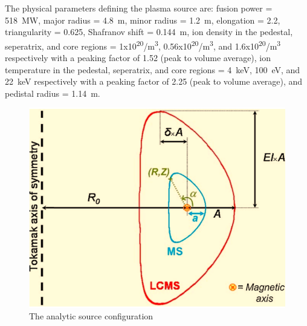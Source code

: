 \documentclass[12pt, letterpaper]{elsarticle}
\begin{document}
The physical parameters defining the plasma source \cite{ref_11} are: fusion power = \SI{518}{MW}, major radius = \SI{4.8}{m}, minor radius = \SI{1.2}{m}, elongation = 2.2, triangularity = 0.625, Shafranov shift = \SI{0.144}{m}, ion density in the pedestal, seperatrix, and core regions = 1x10\textsuperscript{20}/m\textsuperscript{3}, 0.56x10\textsuperscript{20}/m\textsuperscript{3}, and 1.6x10\textsuperscript{20}/m\textsuperscript{3} respectively with a peaking factor of 1.52 (peak to volume average), ion temperature in the pedestal, seperatrix, and core regions  = \SI{4}{keV}, \SI{100}{eV}, and \SI{22}{keV} respectively with a peaking factor of 2.25 (peak to volume average), and pedistal radius = \SI{1.14}{m}.
\begin{figure}[h!]
  \centering
  \includegraphics[scale=0.2]{../plots/Analytic_source.png}
  \caption{The analytic source configuration}
  \label{fig:Analytic_source}
\end{figure}
\end{document}
